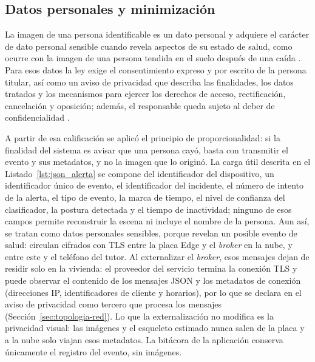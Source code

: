 \documentclass[12pt,a4paper,oneside]{book}
\theoremstyle{plain}
\theoremstyle{definition}
\theoremstyle{remark}
\begin{document}
\subsection{Datos personales y minimización}
\label{sec:datos-personales}

La imagen de una persona identificable es un dato personal y adquiere el carácter de dato personal sensible cuando revela aspectos de su estado de salud, como ocurre con la imagen de una persona tendida en el suelo después de una caída \parencite{lfpdppp2025}. Para esos datos la ley exige el consentimiento expreso y por escrito de la persona titular, así como un aviso de privacidad que describa las finalidades, los datos tratados y los mecanismos para ejercer los derechos de acceso, rectificación, cancelación y oposición; además, el responsable queda sujeto al deber de confidencialidad \parencite{lfpdppp2025}.

A partir de esa calificación se aplicó el principio de proporcionalidad: si la finalidad del sistema es avisar que una persona cayó, basta con transmitir el evento y sus metadatos, y no la imagen que lo originó. La carga útil descrita en el Listado~\ref{lst:json_alerta} se compone del identificador del dispositivo, un identificador único de evento, el identificador del incidente, el número de intento de la alerta, el tipo de evento, la marca de tiempo, el nivel de confianza del clasificador, la postura detectada y el tiempo de inactividad; ninguno de esos campos permite reconstruir la escena ni incluye el nombre de la persona. Aun así, se tratan como datos personales sensibles, porque revelan un posible evento de salud: circulan cifrados con TLS entre la placa Edge y el \textit{broker} en la nube, y entre este y el teléfono del tutor. Al externalizar el \textit{broker}, esos mensajes dejan de residir solo en la vivienda: el proveedor del servicio termina la conexión TLS y puede observar el contenido de los mensajes JSON y los metadatos de conexión (direcciones IP, identificadores de cliente y horarios), por lo que se declara en el aviso de privacidad como tercero que procesa los mensajes (Sección~\ref{sec:topologia-red}). Lo que la externalización no modifica es la privacidad visual: las imágenes y el esqueleto estimado nunca salen de la placa y a la nube solo viajan esos metadatos. La bitácora de la aplicación conserva únicamente el registro del evento, sin imágenes.
\end{document}
